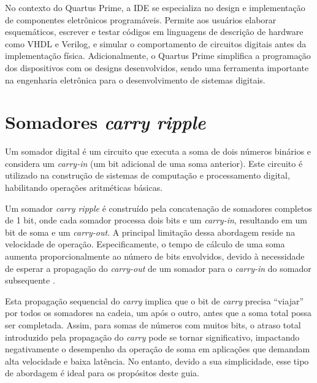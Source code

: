 \documentclass[12pt,a4paper]{article}
\begin{document}
No contexto do Quartus Prime, a IDE se especializa no design e implementação de componentes eletrônicos programáveis. Permite aos usuários elaborar esquemáticos, escrever e testar códigos em linguagens de descrição de hardware como VHDL e Verilog, e simular o comportamento de circuitos digitais antes da implementação física. Adicionalmente, o Quartus Prime simplifica a programação dos dispositivos com os designs desenvolvidos, sendo uma ferramenta importante na engenharia eletrônica para o desenvolvimento de sistemas digitais.

\section{Somadores \textit{carry ripple}}

Um somador digital é um circuito que executa a soma de dois números binários e considera um \textit{carry-in} (um bit adicional de uma soma anterior). Este circuito é utilizado na construção de sistemas de computação e processamento digital, habilitando operações aritméticas básicas\cite{YouTube2020luiz,Tocci2007SistemasDigitais}.

Um somador \textit{carry ripple} é construído pela concatenação de somadores completos de 1 bit, onde cada somador processa dois bits e um \textit{carry-in}, resultando em um bit de soma e um \textit{carry-out}. A principal limitação dessa abordagem reside na velocidade de operação. Especificamente, o tempo de cálculo de uma soma aumenta proporcionalmente ao número de bits envolvidos, devido à necessidade de esperar a propagação do \textit{carry-out} de um somador para o \textit{carry-in} do somador subsequente \cite{YouTube2021descomplica}.

Esta propagação sequencial do \textit{carry} implica que o bit de \textit{carry} precisa ``viajar'' por todos os somadores na cadeia, um após o outro, antes que a soma total possa ser completada. Assim, para somas de números com muitos bits, o atraso total introduzido pela propagação do \textit{carry} pode se tornar significativo, impactando negativamente o desempenho da operação de soma em aplicações que demandam alta velocidade e baixa latência. No entanto, devido a sua simplicidade, esse tipo de abordagem é ideal para os propósitos deste guia.

\end{document}
